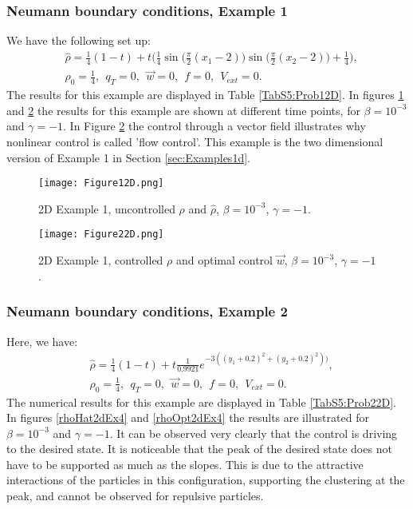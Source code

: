 \subsubsection{Neumann boundary conditions, Example 1}	
We have the following set up:
\begin{align*}
&\widehat \rho = \frac{1}{4}(1-t) + t\bigg(\frac{1}{4}\sin \bigg(\frac{\pi}{2}(x_1 - 2)\bigg)\sin \bigg(\frac{\pi}{2}(x_2 - 2)\bigg) + \frac{1}{4}\bigg),\\
&\rho_0 = \frac{1}{4},\ \
q_{T} = 0,\ \
\vec{w} = 0,\ \
f =0,\ \
V_{ext} =0.
\end{align*}
The results for this example are displayed in Table \ref{TabS5:Prob12D}. In figures \ref{rhoHat2dEx2} and \ref{rhoOpt2dEx2} the results for this example are shown at different time points, for $\beta = 10^{-3}$ and $\gamma = -1$. In Figure \ref{rhoOpt2dEx2} the control through a vector field illustrates why nonlinear control is called 'flow control'. This example is the two dimensional version of Example 1 in Section \ref{sec:Examples1d}. 


\begin{figure}[h]
	\texttt{[image: Figure12D.png]}
	\caption{2D Example 1, uncontrolled $\rho$ and $\widehat \rho$, $\beta = 10^{-3}$, $\gamma = -1$.}
	\label{rhoHat2dEx2}
\end{figure}
\begin{figure}[h]
	\texttt{[image: Figure22D.png]}
	\caption{2D Example 1, controlled $\rho$ and optimal control $\vec{w}$, $\beta = 10^{-3}$, $\gamma = -1$.}
	\label{rhoOpt2dEx2}
\end{figure}


\subsubsection{Neumann boundary conditions, Example 2}	
Here, we have:
\begin{align*}
&\widehat \rho = \frac{1}{4}(1-t) + t\frac{1}{0.9921}e^{-3((y_1+0.2)^2 + (y_2+0.2)^2))},\\
&\rho_0 = \frac{1}{4},\ \
q_{T} = 0,\ \
\vec{w} = 0,\ \
f =0,\ \
V_{ext} =0.
\end{align*}
The numerical results for this example are displayed in Table \ref{TabS5:Prob22D}. In figures \ref{rhoHat2dEx4} and \ref{rhoOpt2dEx4} the results are illustrated for $\beta = 10^{-3}$ and $\gamma = -1$. It can be observed very clearly that the control is driving to the desired state. It is noticeable that the peak of the desired state does not have to be supported as much as the slopes. This is due to the attractive interactions of the particles in this configuration, supporting the clustering at the peak, and cannot be observed for repulsive particles.


